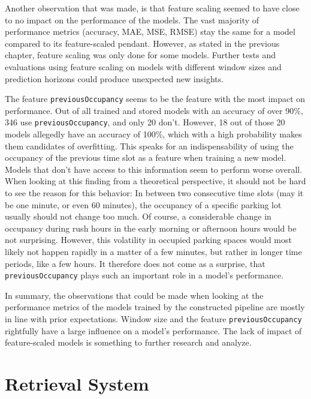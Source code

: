   Another observation that was made, is that feature scaling seemed to have close to no impact on the performance of the models. The vast majority of performance metrics (accuracy, MAE, MSE, RMSE) stay the same for a model compared to its feature-scaled pendant. However, as stated in the previous chapter, feature scaling was only done for some models. Further tests and evaluations using feature scaling on models with different window sizes and prediction horizons could produce unexpected new insights.
  
  The feature \texttt{previousOccupancy} seems to be the feature with the most impact on performance. Out of all trained and stored models with an accuracy of over 90\%, 346 use \texttt{previousOccupancy}, and only 20 don’t. However, 18 out of those 20 models allegedly have an accuracy of 100\%, which with a high probability makes them candidates of overfitting. This speaks for an indispensability of using the occupancy of the previous time slot as a feature when training a new model. Models that don’t have access to this information seem to perform worse overall. When looking at this finding from a theoretical perspective, it should not be hard to see the reason for this behavior: In between two consecutive time slots (may it be one minute, or even 60 minutes), the occupancy of a specific parking lot usually should not change too much. Of course, a considerable change in occupancy during rush hours in the early morning or afternoon hours would be not surprising. However, this volatility in occupied parking spaces would most likely not happen rapidly in a matter of a few minutes, but rather in longer time periods, like a few hours. It therefore does not come as a surprise, that \texttt{previousOccupancy} plays such an important role in a model’s performance.
  
  In summary, the observations that could be made when looking at the performance metrics of the models trained by the constructed pipeline are mostly in line with prior expectations. Window size and the feature \texttt{previousOccupancy} rightfully have a large influence on a model’s performance. The lack of impact of feature-scaled models is something to further research and analyze.
  
  
  
  \section{Retrieval System}


